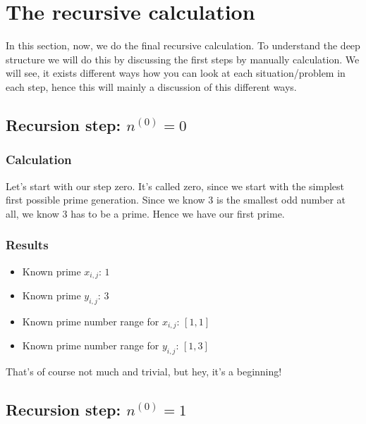 \chapter{The recursive calculation}
\label{ch:therecursivecalculation}
\minitoc
In this section, now, we do the final recursive calculation. To understand the deep structure we will do this by discussing the first steps by manually calculation. We will see, it exists different ways how you can look at each situation/problem in each step, hence this will mainly a discussion of this different ways.
\section{Recursion step: $n^{\left(0\right)} = 0$}
\label{s:recursionstepn0_0}
\subsection{Calculation}
\label{ss:calcualtionstepn0_0}
Let's start with our step zero. It's called zero, since we start with the simplest first possible prime generation. Since we know $3$ is the smallest odd number at all, we know $3$ has to be a prime. Hence we have our first prime.
\subsection{Results}
\label{ss:resultsstepn0_0}
\begin{itemize}
	\item Known prime $x_{i,j}$: $1$
	\item Known prime $y_{i,j}$: $3$
	\item Known prime number range for $x_{i,j}$: $[1,1]$
	\item Known prime number range for $y_{i,j}$: $[1,3]$
\end{itemize}

That's of course not much and trivial, but hey, it's a beginning!
\section{Recursion step: $n^{\left(0\right)} = 1$}
\label{s:recursionstepn0_1}
